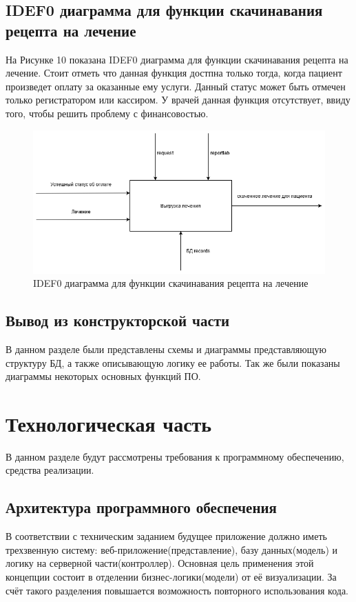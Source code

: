 \documentclass[a4paper, 10pt]{article}
\begin{document}
	\subsection{IDEF0 диаграмма для функции скачинавания рецепта на лечение}
	На Рисунке 10 показана IDEF0 диаграмма для функции скачинавания рецепта на лечение. Стоит отметь что данная функция достпна только тогда, когда пациент произведет оплату за оказанные ему услуги. Данный статус может быть отмечен только регистратором или кассиром. У врачей данная функция отсутствует, ввиду того, чтобы решить проблему с финансовостью.
	
	\begin{figure}[h!]
		\centering
		\includegraphics[scale=0.5]{idef01}
		\centering\caption{IDEF0 диаграмма для функции скачинавания рецепта на лечение}
	\end{figure}
	\subsection{Вывод из конструкторской части}
	\hspace*{5mm} В данном разделе были представлены схемы и диаграммы представляющую структуру БД, а также описывающую логику ее работы. Так же были показаны диаграммы некоторых основных функций ПО.	 
\clearpage
\newpage
\section{Технологическая часть}
	\hspace*{5mm} В данном разделе будут рассмотрены требования к программному обеспечению, средства реализации.

	\subsection{Архитектура программного обеспечения}
	\hspace*{5mm} В соответствии с техническим заданием будущее приложение должно иметь трехзвенную систему: веб-приложение(представление), базу данных(модель) и логику на серверной части(контроллер). Основная цель применения этой концепции состоит в отделении бизнес-логики(модели) от её визуализации. За счёт такого разделения повышается возможность повторного использования кода.
\end{document}
